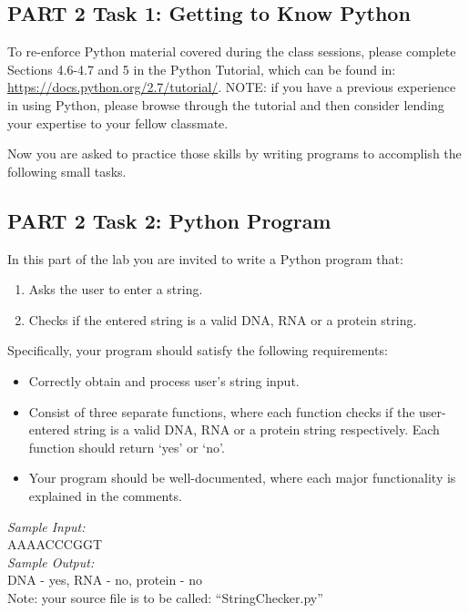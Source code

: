 \vspace*{-.1in}
\subsection*{PART 2  Task 1: Getting to Know Python}
\vspace*{-.1in} 

To re-enforce Python material covered during the class sessions, please complete Sections 4.6-4.7 and 5 in the Python Tutorial, which can be found in: \url{https://docs.python.org/2.7/tutorial/}. NOTE: if you have a previous experience in using Python, please browse through the tutorial and then consider lending your expertise to your fellow classmate.

\noindent Now you are asked to practice those skills by writing programs to accomplish the following small tasks.

\vspace*{-.1in}
\subsection*{PART 2  Task 2: Python Program}
\vspace*{-.1in} 

In this part of the lab you are invited to write a Python program that:

\begin{enumerate}
	\item Asks the user to enter a  string.
	\item Checks if the entered string is a valid DNA, RNA or a protein string.
\end{enumerate}

\color{red}
\noindent Specifically, your program should satisfy the following requirements:
\begin{itemize}
	\item Correctly obtain and process user's string input.
	\item Consist of three separate functions, where each function checks if the user-entered string is a valid DNA, RNA or a protein string respectively. Each function should return `yes' or `no'.
	\item Your program should be well-documented, where each major functionality is explained in the comments.
\end{itemize}
\color{black}


\noindent \emph{Sample Input: } \\
\noindent AAAACCCGGT \\
\emph{Sample Output: } \\
DNA - yes, RNA - no, protein - no\\
\noindent
Note: your source file is to be called: ``StringChecker.py''

